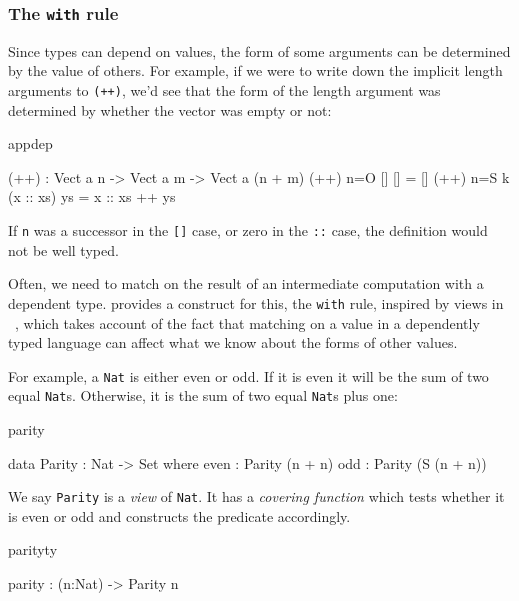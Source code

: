 \subsubsection{The \texttt{with} rule}

Since types can depend on values, the form of some arguments can be determined
by the value of others. For example, if we were to write down the implicit
length arguments to \texttt{(++)}, we'd see that the form of the length argument was
determined by whether the vector was empty or not:

\begin{SaveVerbatim}{appdep}

(++) : Vect a n -> Vect a m -> Vect a (n + m)
(++) {n=O}   []        [] = []
(++) {n=S k} (x :: xs) ys = x :: xs ++ ys

\end{SaveVerbatim}

\noindent
If \texttt{n} was a successor in the \texttt{[]} case, or zero in the 
\texttt{::} case, the definition
would not be well typed.

Often, we need to match on the result of an intermediate computation
with a dependent type.
\Idris{} provides a construct for this, the \texttt{with} rule, 
inspired by views in \Epigram~\cite{McBride2004a},
which takes account of the
fact that matching on a value in a dependently typed language can affect what
we know about the forms of other values. 

For example, a \texttt{Nat} is either even or odd. 
If it is even it will
be the sum of two equal \texttt{Nat}s. Otherwise, it is the sum of two equal \texttt{Nat}s 
plus one:

\begin{SaveVerbatim}{parity}

data Parity : Nat -> Set where
   even : Parity (n + n)
   odd  : Parity (S (n + n))

\end{SaveVerbatim}

\noindent
We say \texttt{Parity} is a \emph{view} of \texttt{Nat}. 
It has a \emph{covering function} which tests whether
it is even or odd and constructs the predicate accordingly.

\begin{SaveVerbatim}{parityty}

parity : (n:Nat) -> Parity n

\end{SaveVerbatim}


